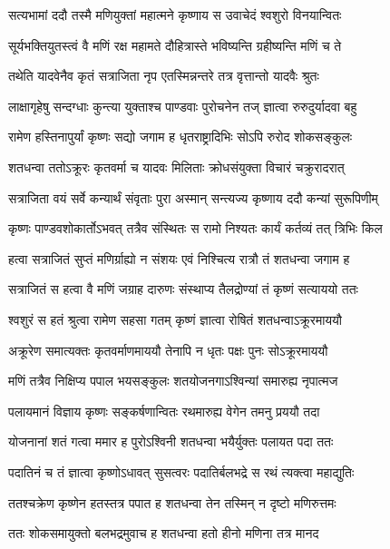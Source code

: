 \twolineshloka
{सत्यभामां ददौ तस्मै मणियुक्तां महात्मने}
{कृष्णाय स उवाचेदं श्वशुरो विनयान्वितः} %

\twolineshloka
{सूर्यभक्तियुतस्त्वं वै मणिं रक्ष महामते}
{दौहित्रास्ते भविष्यन्ति ग्रहीष्यन्ति मणिं च ते} %

\twolineshloka
{तथेति यादवेनैव कृतं सत्राजिता नृप}
{एतस्मिन्नन्तरे तत्र वृत्तान्तो यादवैः श्रुतः} %

\twolineshloka
{लाक्षागृहेषु सन्दग्धाः कुन्त्या युक्ताश्च पाण्डवाः}
{पुरोचनेन तज् ज्ञात्वा रुरुदुर्यादवा बहु} %

\twolineshloka
{रामेण हस्तिनापुर्यां कृष्णः सद्यो जगाम ह}
{धृतराष्ट्रादिभिः सोऽपि रुरोद शोकसङ्कुलः} %

\twolineshloka
{शतधन्वा ततोऽक्रूरः कृतवर्मा च यादवः}
{मिलिताः क्रोधसंयुक्ता विचारं चक्रुरादरात्} %

\twolineshloka
{सत्राजिता वयं सर्वे कन्यार्थं संवृताः पुरा}
{अस्मान् सन्त्यज्य कृष्णाय ददौ कन्यां सुरूपिणीम्} %

\twolineshloka
{कृष्णः पाण्डवशोकार्तोऽभवत् तत्रैव संस्थितः}
{स रामो निश्यतः कार्यं कर्तव्यं तत् त्रिभिः किल} %

\twolineshloka
{हत्वा सत्राजितं सुप्तं मणिर्ग्राह्यो न संशयः}
{एवं निश्चित्य रात्रौ तं शतधन्वा जगाम ह} %

\twolineshloka
{सत्राजितं स हत्वा वै मणिं जग्राह दारुणः}
{संस्थाप्य तैलद्रोण्यां तं कृष्णं सत्याययो ततः} %

\twolineshloka
{श्वशुरं स हतं श्रुत्वा रामेण सहसा गतम्}
{कृष्णं ज्ञात्वा रोषितं शतधन्वाऽक्रूरमाययौ} %

\twolineshloka
{अक्रूरेण समात्यक्तः कृतवर्माणमाययौ}
{तेनापि न धृतः पक्षः पुनः सोऽक्रूरमाययौ} %

\twolineshloka
{मणिं तत्रैव निक्षिप्य पपाल भयसङ्कुलः}
{शतयोजनगाऽश्विन्यां समारुह्य नृपात्मज} %

\twolineshloka
{पलायमानं विज्ञाय कृष्णः सङ्कर्षणान्वितः}
{रथमारुह्य वेगेन तमनु प्रययौ तदा} %

\twolineshloka
{योजनानां शतं गत्वा ममार ह पुरोऽश्विनी}
{शतधन्वा भयैर्युक्तः पलायत पदा ततः} %

\twolineshloka
{पदातिनं च तं ज्ञात्वा कृष्णोऽधावत् सुसत्वरः}
{पदातिर्बलभद्रे स रथं त्यक्त्वा महाद्युतिः} %

\twolineshloka
{ततश्चक्रेण कृष्णेन हतस्तत्र पपात ह}
{शतधन्वा तेन तस्मिन् न दृष्टो मणिरुत्तमः} %

\twolineshloka
{ततः शोकसमायुक्तो बलभद्रमुवाच ह}
{शतधन्वा हतो हीनो मणिना तत्र मानद} %

